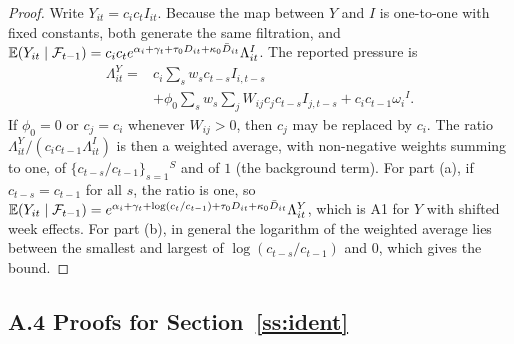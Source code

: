 \begin{proof}
Write $Y_{it}=c_ic_tI_{it}$. Because the map between $Y$ and $I$ is one-to-one with fixed
constants, both generate the same filtration, and
$\mathbb{E}(Y_{it}\mid\mathcal{F}_{t-1})=c_ic_te^{\alpha_i+\gamma_t+\tau_0D_{it}+\kappa_0\bar D_{it}}\Lambda^I_{it}$. The
reported pressure is
\begin{align*}
\Lambda^Y_{it}={}&c_i\sum_sw_sc_{t-s}I_{i,t-s}\\
&+\phi_0\sum_sw_s\sum_jW_{ij}c_jc_{t-s}I_{j,t-s}+c_ic_{t-1}\omega_i{}^I .
\end{align*}
If $\phi_0=0$ or $c_j=c_i$ whenever $W_{ij}>0$, then $c_j$ may be replaced by $c_i$.
The ratio $\Lambda^Y_{it}/(c_ic_{t-1}\Lambda^I_{it})$ is then a weighted average, with non-negative weights summing to
one, of $\{c_{t-s}/c_{t-1}\}_{s=1}{}^S$ and of $1$ (the background term).
For part (a), if $c_{t-s}=c_{t-1}$ for all $s$, the ratio is one, so
$\mathbb{E}(Y_{it}\mid\mathcal{F}_{t-1})=e^{\alpha_i+\gamma_t+\log(c_t/c_{t-1})+\tau_0D_{it}+\kappa_0\bar D_{it}}\Lambda^Y_{it}$,
which is A1 for $Y$ with shifted week effects. For part (b), in general the logarithm of the weighted
average lies between the smallest and largest of $\log(c_{t-s}/c_{t-1})$ and $0$, which gives the
bound.
\end{proof}

\subsection{A.4 Proofs for Section~\ref{ss:ident}}

